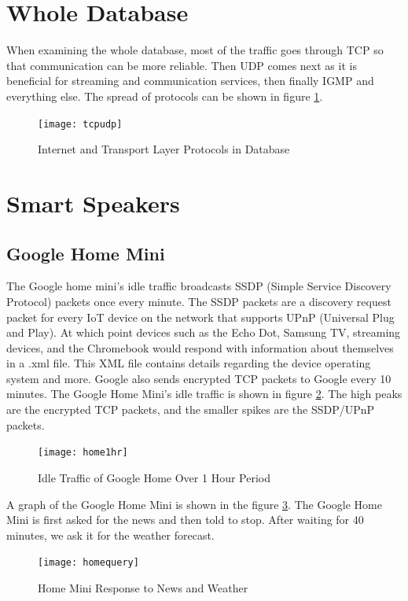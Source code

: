 \section{Whole Database}
\label{wholeDB}
When examining the whole database, most of the traffic goes through TCP so that communication can be more reliable. Then UDP comes next as it is beneficial for streaming and communication services, then finally IGMP and everything else. The spread of protocols can be shown in figure \ref{fig:tcpudp}.

\label{Whole Database}
\begin{figure}[H]
  \centering
    \texttt{[image: tcpudp]}
  \caption{Internet and Transport Layer Protocols in Database}
  \label{fig:tcpudp}
\end{figure}

\section{Smart Speakers}
\label{smartSpeakerResults}
\subsection{Google Home Mini}
The Google home mini's idle traffic broadcasts SSDP (Simple Service Discovery Protocol) packets once every minute. The SSDP packets are a discovery request packet for every IoT device on the network that supports UPnP (Universal Plug and Play). At which point devices such as the Echo Dot, Samsung TV, streaming devices, and the Chromebook would respond with information about themselves in a .xml file. This XML file contains details regarding the device operating system and more. Google also sends encrypted TCP packets to Google every 10 minutes. The Google Home Mini's idle traffic is shown in figure \ref{fig:home}. The high peaks are the encrypted TCP packets, and the smaller spikes are the SSDP/UPnP packets.

\begin{figure}[H]
  \centering
    \texttt{[image: home1hr]}
  \caption{Idle Traffic of Google Home Over 1 Hour Period}
  \label{fig:home}
\end{figure}

A graph of the Google Home Mini is shown in the figure \ref{fig:homequery}. The Google Home Mini is first asked for the news and then told to stop. After waiting for 40 minutes, we ask it for the weather forecast.

\begin{figure}[H]
  \centering
    \texttt{[image: homequery]}
  \caption{Home Mini Response to News and Weather}
  \label{fig:homequery}
\end{figure}

